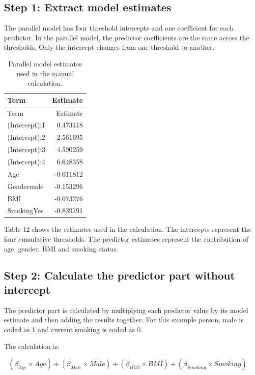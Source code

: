 \documentclass{article}
\begin{document}
\subsection{Step 1: Extract model
estimates}\label{step-1-extract-model-estimates}

The parallel model has four threshold intercepts and one coefficient for
each predictor. In the parallel model, the predictor coefficients are
the same across the thresholds. Only the intercept changes from one
threshold to another.

\begin{longtable}[]{@{}lr@{}}
\caption{Parallel model estimates used in the manual
calculation.}\tabularnewline
\toprule\noalign{}
Term & Estimate \\
\midrule\noalign{}
\endfirsthead
\toprule\noalign{}
Term & Estimate \\
\midrule\noalign{}
\endhead
\bottomrule\noalign{}
\endlastfoot
(Intercept):1 & 0.473418 \\
(Intercept):2 & 2.561695 \\
(Intercept):3 & 4.590259 \\
(Intercept):4 & 6.648358 \\
Age & -0.011812 \\
Gendermale & -0.153296 \\
BMI & -0.073276 \\
SmokingYes & -0.839791 \\
\end{longtable}

Table 12 shows the estimates used in the calculation. The intercepts
represent the four cumulative thresholds. The predictor estimates
represent the contribution of age, gender, BMI and smoking status.

\subsection{Step 2: Calculate the predictor part without
intercept}\label{step-2-calculate-the-predictor-part-without-intercept}

The predictor part is calculated by multiplying each predictor value by
its model estimate and then adding the results together. For this
example person, male is coded as 1 and current smoking is coded as 0.

The calculation is:

\[
(\beta_{Age} \times Age) + (\beta_{Male} \times Male) + (\beta_{BMI} \times BMI) + (\beta_{Smoking} \times Smoking)
\]
\end{document}
